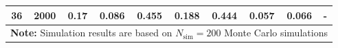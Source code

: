 \begin{landscape}
\begin{table}[!h]
\begin{tabular}{cccccccccc}
	 36  & 2000 &         0.17          & 0.086                                 &                      0.455                       &                     0.188                      &                      0.444                       & \textbf{0.057}           &           0.066            & -                 \\
	\hline
	\hline
    \multicolumn{10}{l}{\textbf{Note:} Simulation results are based on $N_\text{sim} = 200$ Monte Carlo simulations}
    \end{tabular}
    \end{table}
    \egroup
\end{landscape}
    